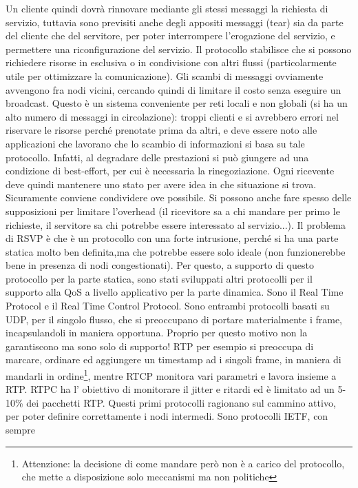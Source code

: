 Un cliente quindi dovrà rinnovare mediante gli stessi messaggi la richiesta di
servizio, tuttavia sono previsiti anche
degli appositi messaggi (tear) sia da parte del cliente che del servitore, per
poter interrompere l'erogazione del
servizio, e permettere una riconfigurazione del servizio. Il protocollo
stabilisce che si possono richiedere risorse
in esclusiva o in condivisione con altri flussi (particolarmente utile per
ottimizzare la comunicazione). Gli scambi
di messaggi ovviamente avvengono fra nodi vicini, cercando quindi di limitare il
costo senza eseguire un broadcast.
Questo è un sistema conveniente per reti locali e non globali (si ha un alto
numero di messaggi in circolazione):
troppi clienti e si avrebbero errori nel riservare le risorse perché prenotate
prima da altri, e deve essere noto alle applicazioni che lavorano che lo scambio
di informazioni si basa su tale protocollo. Infatti, al degradare delle
prestazioni si può giungere ad una condizione di best-effort, per cui è
necessaria la rinegoziazione. Ogni ricevente
deve quindi mantenere uno stato per avere idea in che situazione si trova.
Sicuramente conviene condividere ove
possibile. Si possono anche fare spesso delle supposizioni per limitare
l'overhead (il ricevitore sa a chi mandare per
primo le richieste, il servitore sa chi potrebbe essere interessato al
servizio...).
Il problema di RSVP è che è un protocollo con una forte intrusione, perché si ha
una parte statica molto ben definita,ma che potrebbe essere solo ideale (non
funzionerebbe bene in presenza di nodi congestionati). Per questo, a supporto di
questo protocollo per la parte statica, sono stati sviluppati altri protocolli
per il supporto alla QoS a livello applicativo per la parte dinamica. Sono il
Real Time Protocol e il Real Time Control Protocol. Sono entrambi protocolli
basati su UDP, per il singolo flusso, che si preoccupano di portare
materialmente i frame, incapsulandoli in maniera opportuna. Proprio per questo
motivo non la garantiscono ma sono solo di supporto! RTP per esempio si
preoccupa di marcare, ordinare ed aggiungere un timestamp ad i singoli frame, in
maniera di mandarli in ordine\footnote{Attenzione: la decisione di come mandare
però non è a carico del protocollo, che mette a disposizione solo meccanismi ma
non politiche}, mentre RTCP monitora vari parametri e lavora insieme a RTP. RTPC
ha l'
obiettivo di monitorare il jitter e ritardi ed è limitato ad un 5-10\% dei
pacchetti RTP. Questi primi protocolli ragionano sul cammino attivo, per poter
definire correttamente i nodi intermedi. Sono protocolli IETF, con sempre
